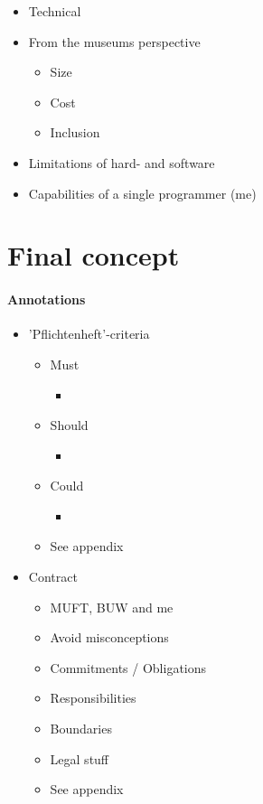 \begin{itemize}
	\item Technical
	\item From the museums perspective
	\begin{itemize}
		\item Size
		\item Cost
		\item Inclusion
	\end{itemize}
	\item Limitations of hard- and software
	\item Capabilities of a single programmer (me)
\end{itemize}


\section{Final concept}
\label{conception_final}

\paragraph{Annotations}

\begin{itemize}
	\item 'Pflichtenheft'-criteria
	\begin{itemize}
		\item Must
		\begin{itemize}
			\item 
		\end{itemize}
		\item Should
		\begin{itemize}
			\item 
		\end{itemize}
		\item Could
		\begin{itemize}
			\item 
		\end{itemize}
		\item See appendix
	\end{itemize}
	\item Contract 
		\begin{itemize}
			\item MUFT, BUW and me
			\item Avoid misconceptions
			\item Commitments / Obligations
			\item Responsibilities
			\item Boundaries
			\item Legal stuff
			\item See appendix
		\end{itemize}
\end{itemize}

